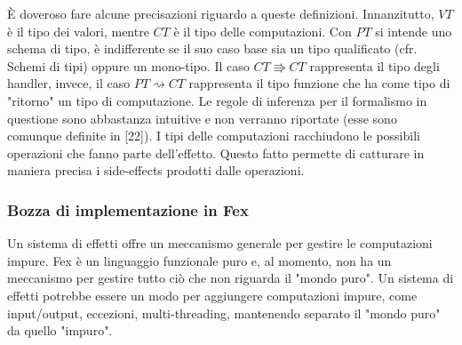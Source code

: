 \documentclass[10pt,a4paper]{article}
\begin{document}
\`E doveroso fare alcune precisazioni riguardo a queste definizioni. Innanzitutto, $ VT $ è il tipo dei valori, mentre
$ CT $ è il tipo delle computazioni. Con $ PT $ si intende uno schema di tipo, è indifferente se il suo caso base sia
un tipo qualificato (cfr. Schemi di tipi) oppure un mono-tipo. Il caso $ CT \Rrightarrow CT $ rappresenta il tipo degli
handler, invece, il caso $ PT \rightsquigarrow CT $ rappresenta il tipo funzione che ha come tipo di "ritorno" un tipo
di computazione. Le regole di inferenza per il formalismo in questione sono abbastanza intuitive e non verranno riportate
(esse sono comunque definite in [22]). I tipi delle computazioni racchiudono le possibili operazioni che fanno parte
dell'effetto. Questo fatto permette di catturare in maniera precisa i side-effects prodotti dalle operazioni.

\subsubsection{Bozza di implementazione in Fex}
Un sistema di effetti offre un meccanismo generale per gestire le computazioni impure. Fex è un linguaggio
funzionale puro e, al momento, non ha un meccanismo per gestire tutto ciò che non riguarda il "mondo puro". Un sistema
di effetti potrebbe essere un modo per aggiungere computazioni impure, come input/output, eccezioni, multi-threading,
mantenendo separato il "mondo puro" da quello "impuro".
\end{document}
